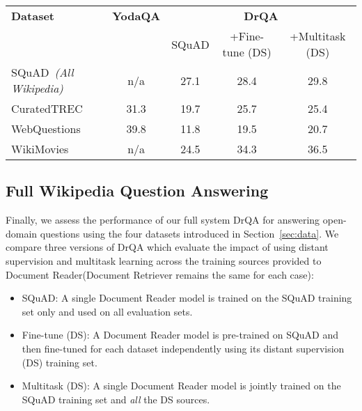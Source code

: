 \documentclass[11pt,a4paper]{article}
\newcommand\squad{SQuAD\xspace}
\newcommand\curq{CuratedTREC-S\xspace}
\newcommand\lcurq{CuratedTREC\xspace}
\newcommand\wikim{WikiMovies\xspace}
\newcommand\wq{WebQuestions\xspace}
\newcommand\us{DrQA\xspace}
\newcommand\usr{Document Retriever\xspace}
\newcommand\usp{Document Reader\xspace}
\begin{document}
\begin{table*}[ht]
\begin{center}
\begin{tabular}{l|c|ccc}
\hline
\bf Dataset &  \bf YodaQA &  \multicolumn{3}{c}{\bf \us} \\
&   &  SQuAD &  +Fine-tune (DS) & +Multitask (DS) \\
\hline
\squad~{\small\it(All Wikipedia)}&  n/a & 27.1 & 28.4 & 29.8\\
\lcurq & 31.3 & 19.7 & 25.7 & 25.4   \\
\wq & 39.8 & 11.8 & 19.5 & 20.7  \\
\wikim & n/a & 24.5 & 34.3 & 36.5  \\
\hline
\end{tabular}
\end{center}
\caption{\label{tab:full-pip-res} Full Wikipedia results. Top-1 exact-match accuracy (in \%, using SQuAD eval script). +Fine-tune (DS): \usp models trained on SQuAD and fine-tuned on each DS training set independently. +Multitask (DS): \usp single model trained on SQuAD and all the distant supervision (DS) training sets jointly. YodaQA results are extracted from {\small \url{https://github.com/brmson/yodaqa/wiki/Benchmarks}} and use additional resources such as Freebase and
DBpedia, see Section \ref{sec:rwork}.}
\end{table*}

\subsection{Full Wikipedia Question Answering}

Finally, we assess the performance of our full system \us for answering open-domain questions using the four datasets introduced in Section~\ref{sec:data}.
%
We compare three versions of \us which evaluate the impact of using distant supervision and multitask learning across the training sources provided to \usp (\usr remains the same for each case):
\begin{itemize}
\item SQuAD:
A single \usp model is trained on the SQuAD training set only and used on all evaluation sets.
\vspace{-1mm}
\item
Fine-tune (DS): A \usp model is pre-trained on SQuAD and then fine-tuned for each dataset independently using its distant supervision (DS) training set.
\vspace{-1mm}
\item
Multitask (DS): A single \usp model is jointly trained on the SQuAD training set and {\em all} the DS sources.
\end{itemize}
\end{document}
